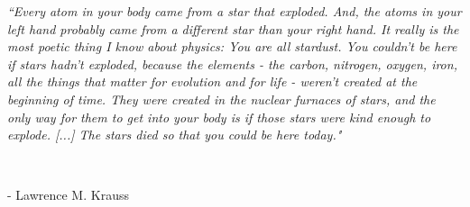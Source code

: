 \thispagestyle{empty}
\vspace*{\fill}

\begin{flushright}

\large{\em ``Every atom in your body came from a star that exploded. And, the atoms in your left hand probably came from a different star than your right hand. It really is the most poetic thing I know about physics: You are all stardust. You couldn't be here if stars hadn't exploded, because the elements - the carbon, nitrogen, oxygen, iron, all the things that matter for evolution and for life - weren't created at the beginning of time. They were created in the nuclear furnaces of stars, and the only way for them to get into your body is if those stars were kind enough to explode. [...] The stars died so that you could be here today."}


%
%
%
%
%
%
%
%
%
%
%
%
%
%
%


\ \

\normalsize
{- Lawrence M. Krauss}
\end{flushright}




\vspace*{\fill}

\vspace*{\fill}

\vspace*{\fill}


